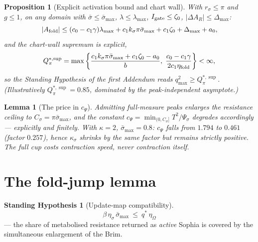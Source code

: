 \documentclass[11pt,a4paper,oneside]{book}
\newcommand{\Igate}{I_{\rm gate}}
\newcommand{\Af}{A_{\rm fold}}
\newcommand{\rs}{r_\sigma}
\theoremstyle{plain}
\newtheorem{proposition}{Proposition}[chapter]
\newtheorem{lemma}{Lemma}[chapter]
\theoremstyle{definition}
\newtheorem{assumption}{Standing Hypothesis}[chapter]
\theoremstyle{remark}
\begin{document}
\begin{proposition}[Explicit activation bound and chart wall]\label{lyapunovaddendum2:prop:piwall}
With $\rs\le\pi$ and $g\le1$, on any domain with $\bar\sigma\le\bar\sigma_{\max}$,
$\lambda\le\lambda_{\max}$, $\Igate\le\zeta_0$, $|\Delta A_R|\le\Delta_{\max}$:
\begin{equation}
|\Af|\le(c_0-c_1\gamma)\lambda_{\max}+c_1k_\sigma\pi\bar\sigma_{\max}+c_1\zeta_0+\Delta_{\max}+a_0,
\end{equation}
and the chart-wall supremum is explicit,
\begin{equation}
Q^{*,\sup}_{\pi}
=\max\left\{\frac{c_1k_\sigma\pi\bar\sigma_{\max}+c_1\zeta_0-a_0}{b},\;
\frac{c_0-c_1\gamma}{2c_1\eta_{\rm fold}}\right\}<\infty,
\end{equation}
so the Standing Hypothesis of the first Addendum reads $q_{\max}^2\ge Q^{*,\sup}_{\pi}$.
(Illustratively $Q^{*,\sup}_{\pi}=0.85$, dominated by the peak-independent asymptote.)
\end{proposition}

\begin{lemma}[The price in $c_\Psi$]\label{lyapunovaddendum2:lem:cpsi}
Admitting full-measure peaks enlarges the resistance ceiling to $C_\sigma=\pi\bar\sigma_{\max}$, and the
constant $c_\Psi=\min_{(0,C_\sigma]}T^2/\Psi_\sigma$ degrades accordingly --- explicitly and finitely.
With $\kappa=2$, $\bar\sigma_{\max}=0.8$: $c_\Psi$ falls from $1.794$ to $0.461$ (factor $0.257$), hence
$\kappa_\sigma$ shrinks by the same factor but remains strictly positive. The full cup costs contraction
speed, never contraction itself.
\end{lemma}

\section{The fold-jump lemma}

\begin{assumption}[Update-map compatibility]\label{lyapunovaddendum2:H:compat}
\begin{equation}
\boxed{\;\beta\,\eta_\sigma\,\bar\sigma_{\max}\ \le\ q^\ast\,\eta_\Omega\;}
\end{equation}
--- the share of metabolised resistance returned as \emph{active} Sophia is covered by the simultaneous
enlargement of the Brim.
\end{assumption}
\end{document}
